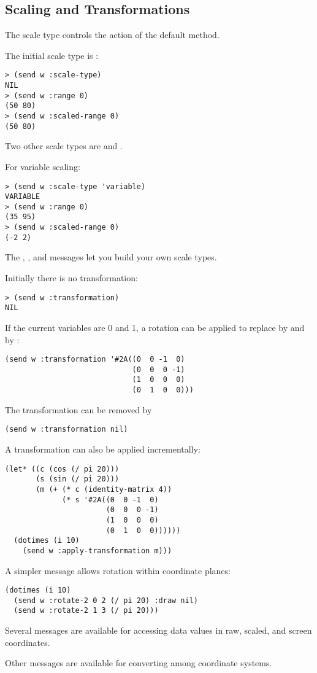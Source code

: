 \begin{slide}{}
\subsection{Scaling and Transformations}
The scale type controls the action of the default
 method.

The initial scale type is :
{\Large
\begin{verbatim}
> (send w :scale-type)
NIL
> (send w :range 0)
(50 80)
> (send w :scaled-range 0)
(50 80)
\end{verbatim}}
Two other scale types are  and .

For variable scaling:
{\Large
\begin{verbatim}
> (send w :scale-type 'variable)
VARIABLE
> (send w :range 0)
(35 95)
> (send w :scaled-range 0)
(-2 2)
\end{verbatim}}
The , , and 
messages let you build your own scale types.

\end{slide}

\begin{slide}{}
Initially there is no transformation:
{\Large
\begin{verbatim}
> (send w :transformation)
NIL
\end{verbatim}}
If the current variables are 0 and 1, a rotation can be applied to
replace  by  and  by :
{\Large
\begin{verbatim}
(send w :transformation '#2A((0  0 -1  0)
                             (0  0  0 -1)
                             (1  0  0  0)
                             (0  1  0  0)))
\end{verbatim}}
The transformation can be removed by
{\Large
\begin{verbatim}
(send w :transformation nil)
\end{verbatim}}
\end{slide}

\begin{slide}{}
A transformation can also be applied incrementally:
{\Large
\begin{verbatim}
(let* ((c (cos (/ pi 20)))
       (s (sin (/ pi 20)))
       (m (+ (* c (identity-matrix 4))
             (* s '#2A((0  0 -1  0)
                       (0  0  0 -1)
                       (1  0  0  0)
                       (0  1  0  0))))))
  (dotimes (i 10)
    (send w :apply-transformation m)))
\end{verbatim}}
A simpler message allows rotation within coordinate planes:
{\Large
\begin{verbatim}
(dotimes (i 10)
  (send w :rotate-2 0 2 (/ pi 20) :draw nil)
  (send w :rotate-2 1 3 (/ pi 20)))
\end{verbatim}}
Several messages are available for accessing data values in
raw, scaled, and screen coordinates.

Other messages are available for converting among coordinate systems.

\end{slide}

